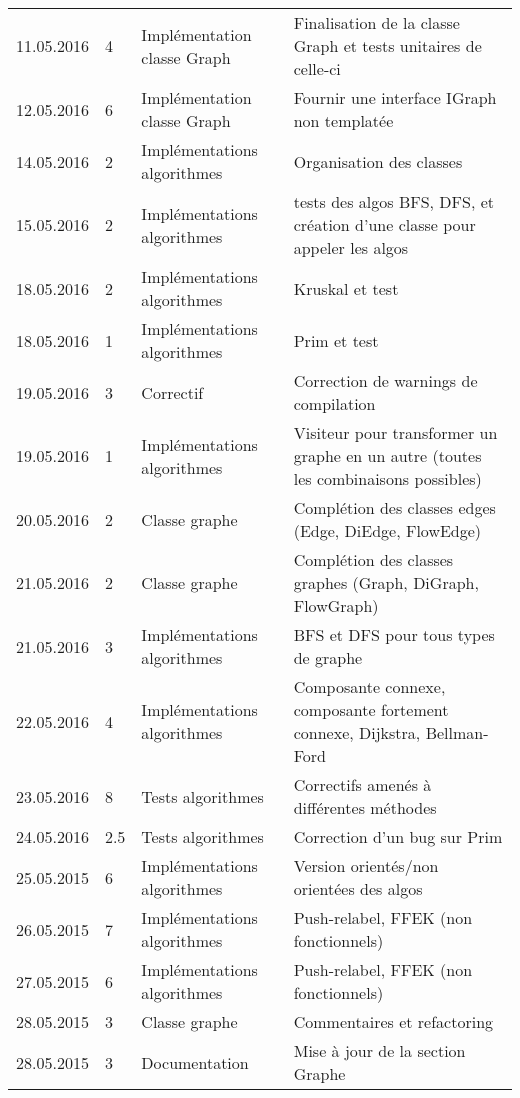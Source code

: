 \documentclass[french]{article}
\begin{document}
\begin{longtable}{p{}|p{}|p{}|p{}}
		11.05.2016 & 4 & Implémentation classe Graph & Finalisation de la classe Graph et tests unitaires de celle-ci \\
		12.05.2016 & 6 & Implémentation classe Graph & Fournir une interface IGraph non templatée \\
		14.05.2016 & 2 & Implémentations algorithmes & Organisation des classes \\
		15.05.2016 & 2 & Implémentations algorithmes & tests des algos BFS, DFS, et création d'une classe pour appeler les algos \\
		\hline
		18.05.2016 & 2 & Implémentations algorithmes & Kruskal et test\\
		18.05.2016 & 1 & Implémentations algorithmes & Prim et test\\
		19.05.2016 & 3 & Correctif & Correction de warnings de compilation\\
		19.05.2016 & 1 & Implémentations algorithmes & Visiteur pour transformer un graphe en un autre (toutes les combinaisons possibles)\\
		20.05.2016 & 2 & Classe graphe & Complétion des classes edges (Edge, DiEdge, FlowEdge)\\
		21.05.2016 & 2 & Classe graphe & Complétion des classes graphes (Graph, DiGraph, FlowGraph)\\
		21.05.2016 & 3 & Implémentations algorithmes & BFS et DFS pour tous types de graphe\\
		22.05.2016 & 4 & Implémentations algorithmes & Composante connexe, composante fortement connexe, Dijkstra, Bellman-Ford\\
		\hline
		23.05.2016 & 8 & Tests algorithmes & Correctifs amenés à différentes méthodes\\
		24.05.2016 & 2.5 & Tests algorithmes & Correction d'un bug sur Prim\\
		25.05.2015 & 6 & Implémentations algorithmes & Version orientés/non orientées des algos\\
		26.05.2015 & 7 & Implémentations algorithmes & Push-relabel, FFEK (non fonctionnels)\\
		27.05.2015 & 6 & Implémentations algorithmes & Push-relabel, FFEK (non fonctionnels)\\
		28.05.2015 & 3 & Classe graphe & Commentaires et refactoring\\
		28.05.2015 & 3 & Documentation & Mise à jour de la section Graphe\\
	\end{longtable}
	
\end{document}
